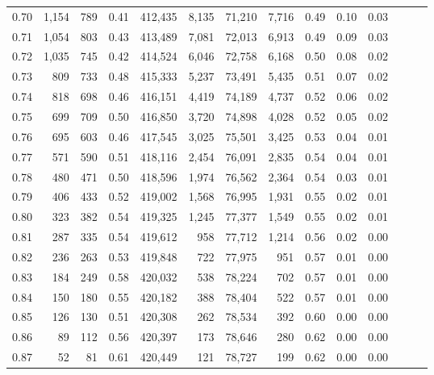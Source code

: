 \begin{tabular}{rrrrrrrrrrrrrr}
0.70 &   1,154 &    789 &  0.41 &  412,435 &    8,135 &  71,210 &   7,716 &  0.49 &  0.10 &      0.03 \\
0.71 &   1,054 &    803 &  0.43 &  413,489 &    7,081 &  72,013 &   6,913 &  0.49 &  0.09 &      0.03 \\
0.72 &   1,035 &    745 &  0.42 &  414,524 &    6,046 &  72,758 &   6,168 &  0.50 &  0.08 &      0.02 \\
0.73 &     809 &    733 &  0.48 &  415,333 &    5,237 &  73,491 &   5,435 &  0.51 &  0.07 &      0.02 \\
0.74 &     818 &    698 &  0.46 &  416,151 &    4,419 &  74,189 &   4,737 &  0.52 &  0.06 &      0.02 \\
0.75 &     699 &    709 &  0.50 &  416,850 &    3,720 &  74,898 &   4,028 &  0.52 &  0.05 &      0.02 \\
0.76 &     695 &    603 &  0.46 &  417,545 &    3,025 &  75,501 &   3,425 &  0.53 &  0.04 &      0.01 \\
0.77 &     571 &    590 &  0.51 &  418,116 &    2,454 &  76,091 &   2,835 &  0.54 &  0.04 &      0.01 \\
0.78 &     480 &    471 &  0.50 &  418,596 &    1,974 &  76,562 &   2,364 &  0.54 &  0.03 &      0.01 \\
0.79 &     406 &    433 &  0.52 &  419,002 &    1,568 &  76,995 &   1,931 &  0.55 &  0.02 &      0.01 \\
0.80 &     323 &    382 &  0.54 &  419,325 &    1,245 &  77,377 &   1,549 &  0.55 &  0.02 &      0.01 \\
0.81 &     287 &    335 &  0.54 &  419,612 &      958 &  77,712 &   1,214 &  0.56 &  0.02 &      0.00 \\
0.82 &     236 &    263 &  0.53 &  419,848 &      722 &  77,975 &     951 &  0.57 &  0.01 &      0.00 \\
0.83 &     184 &    249 &  0.58 &  420,032 &      538 &  78,224 &     702 &  0.57 &  0.01 &      0.00 \\
0.84 &     150 &    180 &  0.55 &  420,182 &      388 &  78,404 &     522 &  0.57 &  0.01 &      0.00 \\
0.85 &     126 &    130 &  0.51 &  420,308 &      262 &  78,534 &     392 &  0.60 &  0.00 &      0.00 \\
0.86 &      89 &    112 &  0.56 &  420,397 &      173 &  78,646 &     280 &  0.62 &  0.00 &      0.00 \\
0.87 &      52 &     81 &  0.61 &  420,449 &      121 &  78,727 &     199 &  0.62 &  0.00 &      0.00 \\

\end{tabular}
